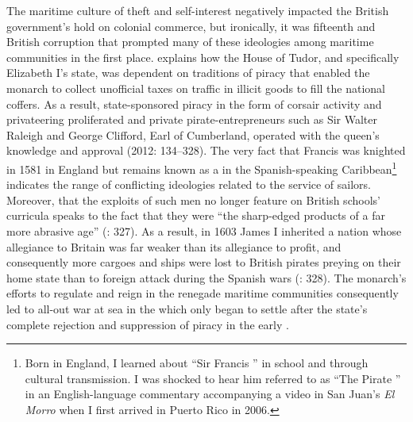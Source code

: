 The maritime culture of theft and self-interest negatively impacted the British government’s hold on colonial commerce, but ironically, it was fifteenth and  British corruption that prompted many of these ideologies among maritime communities in the first place. \citeauthor{Bicheno2012} explains how the House of Tudor, and specifically Elizabeth I’s state, was dependent on traditions of piracy that enabled the monarch to collect unofficial taxes on traffic in illicit goods to fill the national coffers. As a result,  state-sponsored piracy in the form of corsair activity and privateering proliferated and private pirate-entrepreneurs such as Sir Walter Raleigh and George Clifford, Earl of Cumberland, operated with the queen’s knowledge and approval (2012: 134--328). The very fact that Francis  was knighted in 1581 in England but remains known as a  in the Spanish-speaking Caribbean\footnote{Born in England, I learned about “Sir Francis ” in school and through cultural transmission. I was shocked to hear him referred to as “The Pirate ” in an English-language commentary accompanying a video in San Juan’s \textit{El Morro} when I first arrived in Puerto Rico in 2006.}  indicates the range of conflicting ideologies related to the service of sailors.  Moreover, that the exploits of such men no longer feature on British schools’ curricula speaks to the fact that they were “the sharp-edged products of a far more abrasive age” (\citealt{Bicheno2012}: 327). As a result, in 1603 James I inherited a  nation whose allegiance to Britain was far weaker than its allegiance to profit, and consequently more cargoes and ships were lost to British pirates preying on their home state than to foreign attack during the Spanish wars (\citealt{Bicheno2012}: 328). The monarch’s efforts to regulate and reign in the renegade maritime communities consequently led to all-out war at sea in the  which only began to settle after the state’s complete rejection and suppression of piracy in the early . 

